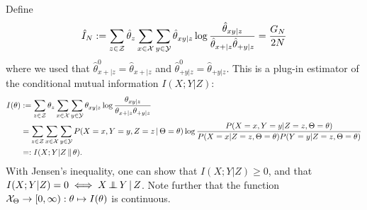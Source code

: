 Define
$$\hat I_N := \sum_{z\in\mathcal{Z}} \hat\theta_{z} \sum_{x\in\mathcal{X}} \sum_{y\in\mathcal{Y}} \hat \theta_{xy|z} \log \frac{\hat \theta_{xy|z}}{\hat \theta_{x+|z} \hat \theta_{+ y|z}}
    = \frac{G_N}{2N}$$
where we used that $\hat\theta^0_{x +|z} = \hat\theta_{x +|z}$ and $\hat\theta^0_{+ y|z} = \hat\theta_{+ y|z}$.
This is a plug-in estimator of the conditional mutual information $I(X;Y|Z)$:
\begin{equation*}\begin{split}
  I(\theta) 
  & := \sum_{z\in\mathcal{Z}} \theta_z \sum_{x\in\mathcal{X}}\sum_{y\in\mathcal{Y}} \theta_{xy|z} \log \frac{\theta_{xy|z}}{\theta_{x +|z} \theta_{+ y|z}} \\
  & = \sum_{z\in\mathcal{Z}} \sum_{x\in\mathcal{X}} \sum_{y\in\mathcal{Y}} P(X=x,Y=y,Z=z \operatorname*{|} \Theta=\theta) \log \frac{P(X=x,Y=y|Z=z,\Theta=\theta)}{P(X=x|Z=z,\Theta=\theta) P(Y=y|Z=z,\Theta=\theta)} \\
  & =: I(X;Y|Z\operatorname*{\Vert} \theta).
\end{split}\end{equation*}
With Jensen's inequality, one can show that $I(X;Y|Z) \ge 0$, and that $I(X;Y|Z) = 0 \iff X \operatorname*{\perp\mkern-11mu\perp} Y \operatorname*{|} Z$.
Note further that the function $\mathcal{X}_\Theta \to [0,\infty) : \theta \mapsto I(\theta)$ is continuous.

